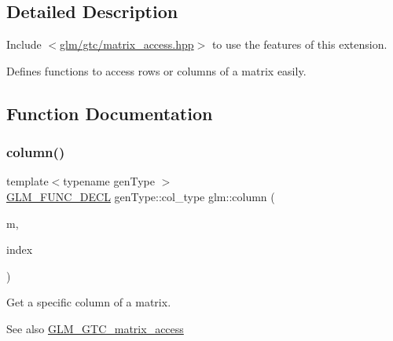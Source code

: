\subsection{Detailed Description}
Include $<$\hyperlink{matrix__access_8hpp}{glm/gtc/matrix\+\_\+access.\+hpp}$>$ to use the features of this extension.

Defines functions to access rows or columns of a matrix easily. 

\subsection{Function Documentation}
\mbox{\label{group__gtc__matrix__access_ga96022eb0d3fae39d89fc7a954e59b374}} 
\subsubsection{\texorpdfstring{column()}{column()}\hspace{0.1cm}{\footnotesize\ttfamily [1/2]}}
{\footnotesize\ttfamily template$<$typename gen\+Type $>$ \\
\hyperlink{setup_8hpp_ab2d052de21a70539923e9bcbf6e83a51}{G\+L\+M\+\_\+\+F\+U\+N\+C\+\_\+\+D\+E\+CL} gen\+Type\+::col\+\_\+type glm\+::column (\begin{DoxyParamCaption}\item[{gen\+Type const \&}]{m,  }\item[{\hyperlink{namespaceglm_a090a0de2260835bee80e71a702492ed9}{length\+\_\+t}}]{index }\end{DoxyParamCaption})}

Get a specific column of a matrix. \begin{DoxySeeAlso}{See also}
\hyperlink{group__gtc__matrix__access}{G\+L\+M\+\_\+\+G\+T\+C\+\_\+matrix\+\_\+access} 
\end{DoxySeeAlso}
\mbox{\label{group__gtc__matrix__access_ga9e757377523890e8b80c5843dbe4dd15}} 
